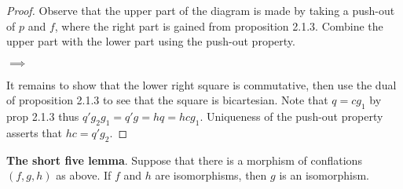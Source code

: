     \begin{proof}
        Observe that the upper part of the diagram is made by taking a push-out of $p$ and $f$, where the right part is gained from proposition 2.1.3. Combine the upper part with the lower part using the push-out property.
        \begin{center}
             $\implies$
        \end{center}
        It remains to show that the lower right square is commutative, then use the dual of proposition 2.1.3 to see that the square is bicartesian. Note that $q=cg_1$ by prop 2.1.3 thus $q'g_2g_1=q'g=hq=hcg_1$. Uniqueness of the push-out property asserts that $hc=q'g_2$.
    \end{proof}

    \begin{corollary}
        \textbf{The short five lemma}. Suppose that there is a morphism of conflations $(f,g,h)$ as above. If $f$ and $h$ are isomorphisms, then $g$ is an isomorphism.
    \end{corollary}

